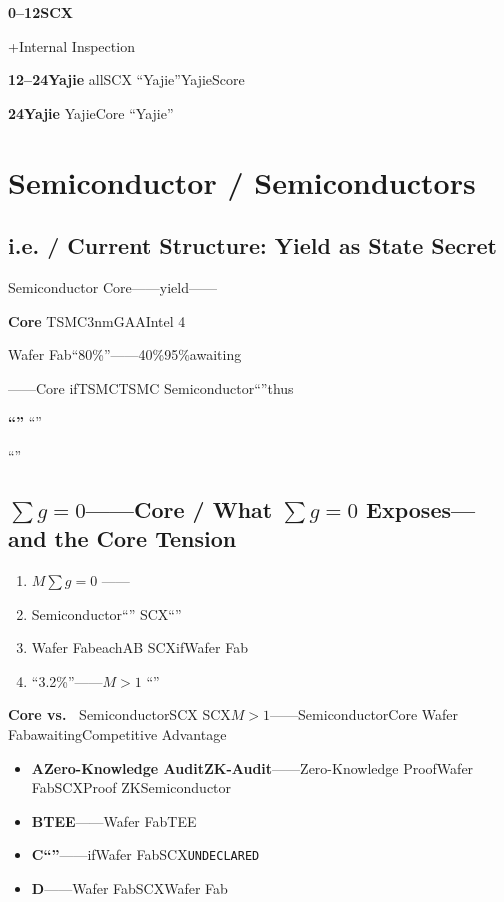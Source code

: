 \documentclass[12pt,a4paper]{article}
\theoremstyle{remark}
\newcommand{\sumgeq}{\sum g = 0}
\newcommand{\undeclared}{\texttt{UNDECLARED}}
\begin{document}
\textbf{0--12SCX}

+Internal Inspection

\textbf{12--24Yajie}
allSCX
``Yajie''YajieScore

\textbf{24Yajie}
YajieCore
``Yajie''


\section{Semiconductor / Semiconductors}

\subsection{i.e. / Current Structure: Yield as State Secret}

Semiconductor
Core——yield——

\textbf{Core}
TSMC3nmGAAIntel 4


Wafer Fab``80\%''——40\%95\%awaiting

\textbf{}
——Core
ifTSMCTSMC
Semiconductor``''thus

\textbf{``''}
``''


``''

\subsection{$\sumgeq$——Core / What $\sumgeq$ Exposes—and the Core Tension}

\begin{enumerate}[leftmargin=*, label=\textbf{(\arabic*)}]
    \item \textbf{}
    $M$$\sumgeq$
    ——

    \item \textbf{}
    Semiconductor``''
    SCX``''

    \item \textbf{}
    Wafer FabeachAB
    SCXifWafer Fab

    \item \textbf{}
    ``3.2\%''——$M>1$
    ``''
\end{enumerate}

\textbf{Core vs.\ }
SemiconductorSCX
SCX$M>1$——SemiconductorCore
Wafer FabawaitingCompetitive Advantage



\begin{itemize}[leftmargin=*]
    \item \textbf{AZero-Knowledge AuditZK-Audit}——Zero-Knowledge ProofWafer FabSCXProof
    ZKSemiconductor

    \item \textbf{BTEE}——Wafer FabTEE

    \item \textbf{C``''}——ifWafer FabSCX\undeclared

    \item \textbf{D}——Wafer FabSCXWafer Fab
\end{itemize}
\end{document}
